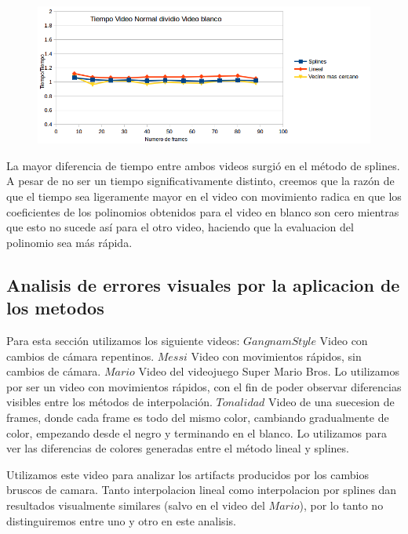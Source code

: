 \begin{figure}
  \vspace{-20pt}
  \begin{center}
    \includegraphics[scale= 0.6]{imagenes/aumentandoFramesMessiSobreWhite.png}
  \end{center}
  \vspace{-10pt}
  \vspace{-10pt}
\end{figure}

La mayor diferencia de tiempo entre ambos videos surgió en el método de splines. A pesar de no ser un tiempo significativamente distinto, creemos que la razón de que el tiempo sea ligeramente mayor en el video con movimiento radica en que los coeficientes de los polinomios obtenidos para el video en blanco son cero mientras que esto no sucede así para el otro video, haciendo que la evaluacion del polinomio sea más rápida.



\subsection{Analisis de errores visuales por la aplicacion de los metodos}
Para esta sección utilizamos los siguiente videos:
$Gangnam Style$ Video con cambios de cámara repentinos.
$Messi$ Video con movimientos rápidos, sin cambios de cámara.
$Mario$ Video del videojuego Super Mario Bros. Lo utilizamos por ser un video con movimientos rápidos, con el fin de poder observar diferencias visibles entre los métodos de interpolación.
$Tonalidad$ Video de una suecesion de frames, donde cada frame es todo del mismo color, cambiando gradualmente de color, empezando desde el negro y terminando en el blanco. Lo utilizamos para ver las diferencias de colores generadas entre el método lineal y splines.


Utilizamos este video para analizar los artifacts producidos por los cambios bruscos de camara. Tanto interpolacion lineal como interpolacion por splines dan resultados visualmente similares (salvo en el video del $Mario$), por lo tanto no distinguiremos entre uno y otro en este analisis.

